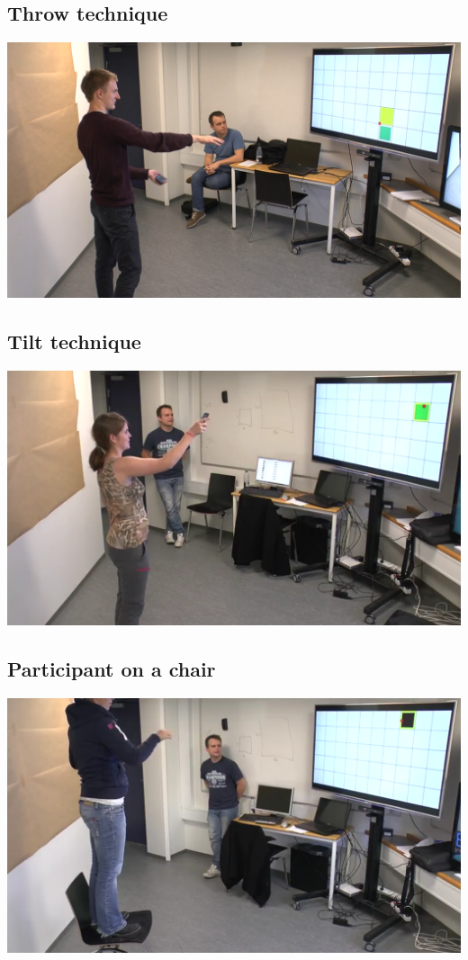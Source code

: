 \subsection*{Throw technique}
\includegraphics[width=\textwidth]{images/sune_nilausen_throw.png}

\subsection*{Tilt technique}
\includegraphics[width=\textwidth]{images/mette_tilt.png}

\subsection*{Participant on a chair}
\includegraphics[width=\textwidth]{images/rikke_on_chair.png}

